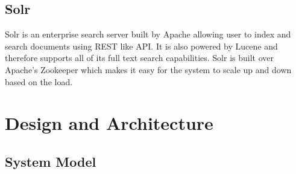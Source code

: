 \documentclass[a4paper,11pt]{kth-mag}
\begin{document}
\section{Solr}

Solr \cite{solr} is an enterprise search server built by Apache allowing user to index and search documents using REST like API. It is also powered by Lucene and therefore supports all of its full text search capabilities. Solr is built over Apache's Zookeeper which makes it easy for the system to scale up and down based on the load.






\chapter{Design and Architecture}
\label{chap:design}

\section{System Model}
\end{document}
